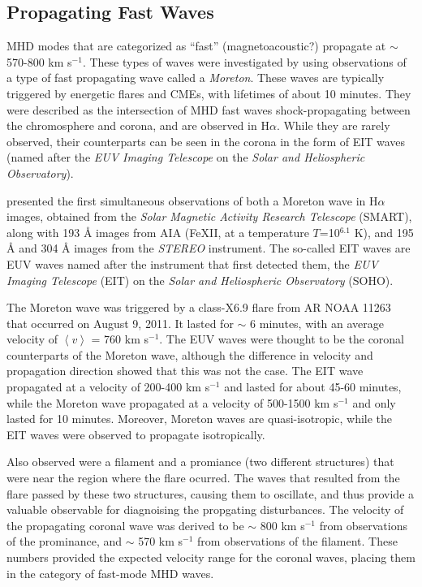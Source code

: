 \documentclass[preprint2]{aastex}
\begin{document}
\subsection{Propagating Fast Waves}%
MHD modes that are categorized as ``fast'' (magnetoacoustic?) propagate
at $\sim$ 570-800 km s$^{-1}$. These types of waves were investigated by
\cite{pfw_1} using observations of a type of fast propagating wave called a
\emph{Moreton}. These waves are
typically triggered by energetic flares and CMEs, with lifetimes of
about 10 minutes.
They were described as the intersection of MHD fast waves shock-propagating
between the chromosphere and corona, and are observed in H$\alpha$.
While they are rarely observed, their
counterparts can be seen in the corona in the form of EIT waves
(named after the \emph{EUV Imaging Telescope} on the
\emph{Solar and Heliospheric Observatory}).

\cite{pfw_1} presented the first simultaneous observations of both
a Moreton wave in H$\alpha$ images, obtained from the
\emph{Solar Magnetic Activity Research Telescope} (SMART),
along with 193 \AA{} images from AIA
(Fe{\footnotesize XII}, at a temperature $T$=10$^{6.1}$ K),
and 195 \AA{} and 304 \AA{} images from the
\emph{STEREO} instrument.
The so-called {EIT} waves are EUV waves
named after the instrument that first detected them,
the \emph{EUV Imaging Telescope} (EIT) on the
\emph{Solar and Heliospheric Observatory} (SOHO).

The Moreton wave was triggered by
a class-X6.9 flare from AR NOAA 11263 that occurred on August 9, 2011.
It lasted for $\sim$ 6 minutes, with an average
velocity of $\left\langle v \right\rangle$ = 760 km s$^{-1}$.
The EUV waves were thought to be the coronal counterparts of the
Moreton wave, although the difference in velocity and propagation
direction showed that this was not the case.
The EIT wave propagated at a velocity of 200-400 km s$^{-1}$ and lasted for
about 45-60 minutes, while the Moreton wave propagated at a velocity
of 500-1500 km s$^{-1}$ and only lasted for 10 minutes.
Moreover, Moreton waves are quasi-isotropic, while the EIT waves were observed to
propagate isotropically.

Also observed were a filament and a promiance (two different structures)
that were near the region where the flare ocurred. The waves that resulted
from the flare passed by these two structures, causing them to oscillate,
and thus provide a valuable observable for diagnoising the propgating
disturbances.
The velocity of the propagating coronal wave was derived to be
$\sim$ 800 km s$^{-1}$ from observations of the prominance, and
$\sim$ 570 km s$^{-1}$ from observations of the filament.
These numbers provided the expected velocity range for the coronal
waves, placing them in the category of fast-mode MHD waves.
\end{document}
